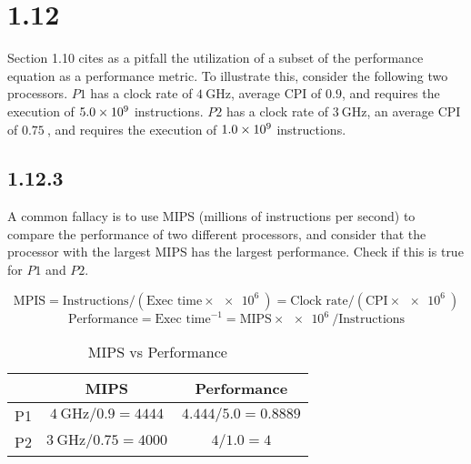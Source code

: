 \documentclass[paper=a4, fontsize=11pt]{scrartcl} %
\begin{document}
\maketitle %

\section{1.12}
\begin{fancyquotes}
  Section 1.10 cites as a pitfall the utilization of a subset of the
  performance equation as a performance metric. To illustrate this,
  consider the following two processors. $P1$ has a clock rate of
  $\SI{4}{\giga\hertz}$, average CPI of $0.9$, and requires the
  execution of $\SI{5.0E9}{}$ instructions. $P2$ has a clock rate of
  $\SI{3}{\giga\hertz}$, an average CPI of $\SI{0.75}{}$, and requires
  the execution of $\SI{1.0E9}{}$ instructions.
\end{fancyquotes}

\subsection{1.12.3}
\begin{fancyquotes}
  A common fallacy is to use MIPS (millions of instructions per
  second) to compare the performance of two different processors, and
  consider that the processor with the largest MIPS has the largest
  performance. Check if this is true for $P1$ and $P2$.
\end{fancyquotes}

$$\text{MPIS} = \text{Instructions} / (\text{Exec time}\times\SI{e6}{})
= \text{Clock rate} /(\text{CPI}\times\SI{e6}{})$$
$$\text{Performance} = \text{Exec time}^{-1}
= \text{MIPS}\times\SI{e6}{} / \text{Instructions}$$

\begin{table}[hp]
  \centering
  \begin{tabular}[hp]{ccc}
    & MIPS & Performance\\
    \toprule
    P1 & $\SI{4}{\giga\hertz}/0.9=4444$  & $4.444/5.0 = 0.8889$ \\
    P2 & $\SI{3}{\giga\hertz}/0.75=4000$ & $4 / 1.0 = 4$
  \end{tabular}
  \caption{MIPS vs Performance}
\end{table}
\end{document}
